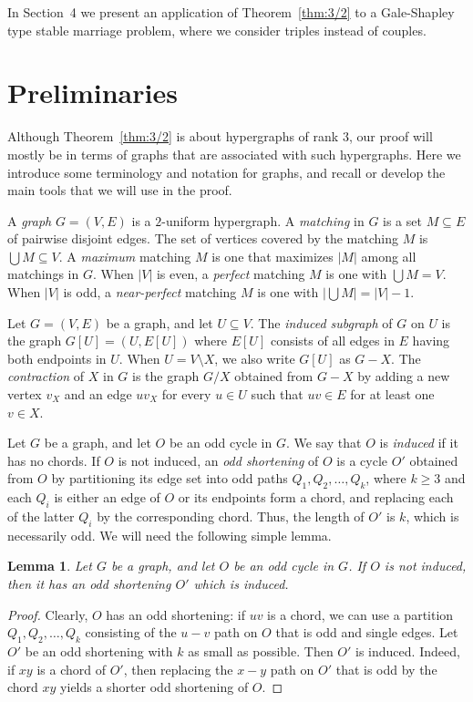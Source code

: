\documentclass{article}
\newtheorem{lemma}[theorem]{Lemma}
\theoremstyle{definition}
\begin{document}
In Section~4 we present an application of Theorem~\ref{thm:3/2} to a Gale-Shapley type stable marriage problem, where we consider triples instead of couples.

\section{Preliminaries}
Although Theorem~\ref{thm:3/2} is about hypergraphs of rank $3$, our proof will mostly be in terms of graphs that are associated with such hypergraphs. Here we introduce some terminology and notation for graphs, and recall or develop the main tools that we will use in the proof.

A \emph{graph} $G=(V,E)$ is a $2$-uniform hypergraph. A \emph{matching} in $G$ is a set $M \subseteq E$ of pairwise disjoint edges. The set of vertices covered by the matching $M$ is $\bigcup M \subseteq V$. A \emph{maximum} matching $M$ is one that maximizes $|M|$ among all matchings in $G$. When $|V|$ is even, a \emph{perfect} matching $M$ is one with $\bigcup M = V$. When $|V|$ is odd, a \emph{near-perfect} matching $M$ is one with $|\bigcup M| = |V| - 1$.

Let $G=(V,E)$ be a graph, and let $U \subseteq V$. The \emph{induced subgraph} of $G$ on $U$ is the graph $G[U] = (U, E[U])$ where $E[U]$ consists of all edges in $E$ having both endpoints in $U$. When $U = V \setminus X$, we also write $G[U]$ as $G - X$. The \emph{contraction} of $X$ in $G$ is the graph $G/X$ obtained from $G - X$ by adding a new vertex $v_X$ and an edge $uv_X$ for every $u \in U$ such that $uv \in E$ for at least one $v \in X$.

Let $G$ be a graph, and let $O$ be an odd cycle in $G$. We say that $O$ is \emph{induced} if it has no chords. If $O$ is not induced, an \emph{odd shortening} of $O$ is a cycle $O'$ obtained from $O$ by partitioning its edge set into odd paths $Q_1, Q_2, \ldots , Q_k$, where $k \ge 3$ and each $Q_i$ is either an edge of $O$ or its endpoints form a chord, and replacing each of the latter $Q_i$ by the corresponding chord. Thus, the length of $O'$ is $k$, which is necessarily odd. We will need the following simple lemma.
\begin{lemma} \label{lem:Short}
Let $G$ be a graph, and let $O$ be an odd cycle in $G$. If $O$ is not induced, then it has an odd shortening $O'$ which is induced.
\end{lemma}
\begin{proof} Clearly, $O$ has an odd shortening: if $uv$ is a chord, we can use a partition $Q_1, Q_2, \ldots , Q_k$ consisting of the $u-v$ path on $O$ that is odd and single edges. Let $O'$ be an odd shortening with $k$ as small as possible. Then $O'$ is induced. Indeed, if $xy$ is a chord of $O'$, then replacing the $x-y$ path on $O'$ that is odd by the chord $xy$ yields a shorter odd shortening of $O$.
\end{proof}
\end{document}
